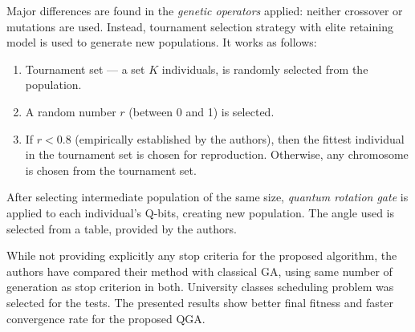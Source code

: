 \documentclass[../header]{subfiles}
\begin{document}
\medskip\noindent
Major differences are found in the \emph{genetic operators} applied:
neither crossover or mutations are used. Instead, tournament selection strategy
with elite retaining model is used to generate new populations.
It works as follows:
\begin{enumerate}
  \item Tournament set --- a set $K$ individuals, is randomly selected from
        the population.
  \item A random number $r$ (between 0 and 1) is selected.
  \item If $r < 0.8$ (empirically established by the authors), then the fittest
        individual in the tournament set is chosen for reproduction.
        Otherwise, any chromosome is chosen from the tournament set.
\end{enumerate}
\noindent
After selecting intermediate population of the same size, \emph{quantum rotation gate}
is applied to each individual's Q-bits, creating new population.
The angle used is selected from a table, provided by the authors.

While not providing explicitly any stop criteria for the proposed algorithm,
the authors have compared their method with classical GA, using same number
of generation as stop criterion in both.
University classes scheduling problem was selected for the tests.
The presented results show better final fitness and faster convergence rate for
the proposed QGA.
\end{document}
